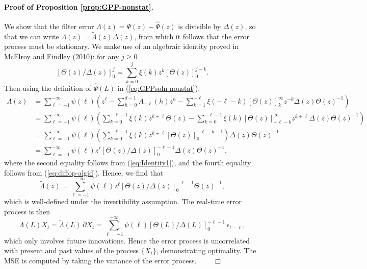 \documentclass[a4paper]{book}
\begin{document}
\paragraph{Proof of Proposition \ref{prop:GPP-nonstat}.} 
 We show that the filter error $\Lambda (z) = \Psi (z) - \widehat{\Psi} (z)$
  is divisible by $\Delta (z)$, so that we can write
   $\Lambda (z) = \widetilde{\Lambda} (z) \Delta (z)$, from which it follows
    that the error process must be stationary.
  We make use of an algebraic identity proved in McElroy and Findley (2010):
  for any $j \geq 0$
\begin{equation}
 \label{eq:diffop-algid}
  {[ \Theta (z)/ \Delta (z)]}_0^{j} = \sum_{k=0}^j \xi (k) z^k { [ \Theta (z) ] }_0^{j-k}.
\end{equation}
 Then using the definition of $\widehat{\Psi}(L)$ in (\ref{eq:GPPsoln-nonstat}),
\begin{align*}    
  \Lambda (z) & =  \sum_{\ell = -1}^{- \infty} \psi (\ell) 
   \left( z^{\ell} - \sum_{h=0}^{d-1} A_{-\ell} (h) z^h  - \sum_{k=1}^{-\ell} \xi (-\ell-k)
    {[ \Theta (z)]}_k^{\infty} z^{-k} \Delta (z) { \Theta (z)}^{-1}  \right) \\
    & = \sum_{\ell = -1}^{- \infty} \psi (\ell) 
   \left( \sum_{k=0}^{-\ell-1} \xi (k) z^{k+\ell} \Theta (z) -
     \sum_{k=0}^{-\ell-1} \xi (k)
    {[ \Theta (z)]}_{-\ell-k}^{\infty} z^{k+\ell} \Delta (z) { \Theta (z)}^{-1} \right) \\
  & = \sum_{\ell = -1}^{- \infty} \psi (\ell) 
   \left( \sum_{k=0}^{-\ell-1} \xi (k)  z^{k+\ell} 
    {[ \Theta (z)]}_0^{-\ell-k-1}   \right) \Delta (z) { \Theta (z)}^{-1} \\
   & = \sum_{\ell = -1}^{- \infty} \psi (\ell) z^{\ell}
    { [ \Theta (z) / \Delta (z)]}_0^{-\ell-1} 
    \Delta (z) { \Theta (z)}^{-1},
\end{align*}    
   where the second equality follows from (\ref{eq:Identity1}), 
    and the fourth equality  follows from (\ref{eq:diffop-algid}).
    Hence, we find that
\[
 \widetilde{\Lambda} (z) = \sum_{\ell = -1}^{- \infty} \psi (\ell) z^{\ell}
    { [ \Theta (z) / \Delta (z)]}_0^{-\ell-1}  { \Theta (z)}^{-1},
\]
 which is well-defined under the invertibility assumption.  
 The real-time error process is then
\[
  \Lambda (L) X_t = \widetilde{\Lambda} (L) \, \partial X_t
    = \sum_{\ell = -1}^{- \infty} \psi (\ell)  
    { [ \Theta (L) / \Delta (L)]}_0^{-\ell-1}\, \epsilon_{t-\ell},
\]
 which only involves future innovations.  Hence the error process is 
  uncorrelated with present and past values of the process $\{ X_t \}$,
   demonstrating optimality.  The MSE is computed 
 by taking the variance of the error process.  $\qquad \Box$
\end{document}
